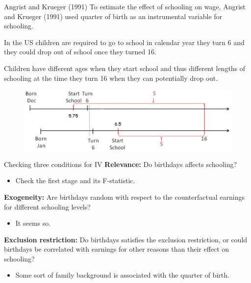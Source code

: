 \documentclass{beamer}
\begin{document}
\begin{frame}{Angrist and Krueger (1991)}
To estimate the effect of schooling on wage, Angrist and Krueger (1991) used quarter of birth as an instrumental variable for schooling.\bigskip

In the US children are required to go to school in calendar year they turn 6 and they could drop out of school once they turned 16.\medskip

Children have different ages when they start school and thus different lengths of schooling at the time they turn 16 when they can potentially drop out.

\begin{figure}
\centering
\includegraphics[width=.8\linewidth]{./Figures/angristkrueger91}
\end{figure}
\end{frame}

\begin{frame}{Checking three conditions for IV}
\textbf{Relevance:} Do birthdays affects schooling?\pause
\begin{itemize}
\item Check the first stage and its F-statistic.
\end{itemize}\bigskip

\textbf{Exogeneity:} Are birthdays random with respect to the
counterfactual earnings for different schooling levels?\pause
\begin{itemize}
\item It seems so.
\end{itemize}\bigskip

\textbf{Exclusion restriction:} Do birthdays satisfies the exclusion restriction, or could birthdays be correlated with earnings for other reasons than their effect on schooling?\pause
\begin{itemize}
\item Some sort of family background is associated with the quarter of birth.
\end{itemize}
\end{frame}
\end{document}
